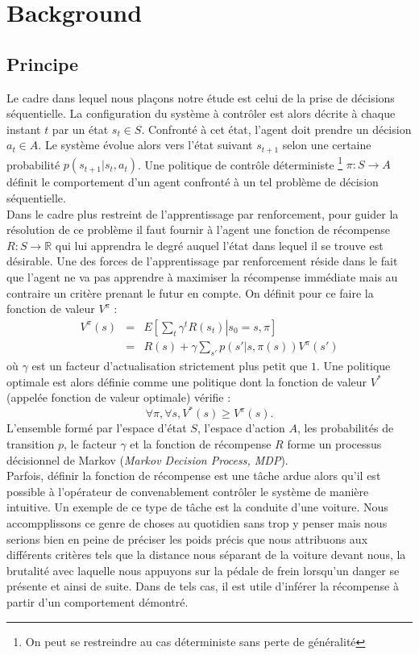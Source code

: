 \documentclass[publibook-draft]{CAp2012}
\begin{document}
\section{Background}
\label{back.sec}
\subsection{Principe}
Le cadre dans lequel nous plaçons notre étude est celui de la prise de décisions séquentielle. La configuration du système à contrôler est alors décrite à chaque instant $t$ par un état $s_t \in S$. Confronté à cet état, l'agent doit prendre un décision $a_t\in A$. Le système évolue alors vers l'état suivant $s_{t+1}$ selon une certaine probabilité $p(s_{t+1}|s_t, a_t)$. Une politique de contrôle déterministe \footnote{On peut se restreindre au cas déterministe sans perte de généralité} $\pi : S\rightarrow A$ définit le comportement d'un agent confronté à un tel problème de décision séquentielle.\\

Dans le cadre plus restreint de l'apprentissage par renforcement, pour guider la résolution de ce problème il faut fournir à l'agent une fonction de récompense $R : S \rightarrow \mathbb{R}$ qui lui apprendra le degré auquel l'état dans lequel il se trouve est désirable. Une des forces de l'apprentissage par renforcement réside dans le fait que l'agent ne va pas apprendre à maximiser la récompense immédiate mais au contraire un critère prenant le futur en compte. On définit pour ce faire la fonction de valeur $V^\pi$ :
\begin{eqnarray}
\label{Vdef.eqn}
V^\pi(s) &=& E\left[\left.\sum_t\gamma^tR(s_t)\right|s_0=s,\pi\right]\\
&=& R(s) + \gamma\sum_{s'}p(s'|s,\pi(s))V^\pi(s')
\end{eqnarray}
où $\gamma$ est un facteur d'actualisation strictement plus petit que $1$. Une politique optimale est alors définie comme une politique dont la fonction de valeur $V^*$ (appelée fonction de valeur optimale) vérifie :
\begin{equation}
\forall \pi, \forall s, V^*(s) \geq V^\pi(s).
\end{equation}
L'ensemble formé par l'espace d'état $S$, l'espace d'action $A$, les probabilités de transition $p$, le facteur $\gamma$ et la fonction de récompense $R$ forme un processus décisionnel de Markov ({\it Markov Decision Process, MDP}).\\

Parfois, définir la fonction de récompense est une tâche ardue alors qu'il est possible à l'opérateur de convenablement contrôler le système de manière intuitive. Un exemple de ce type de tâche est la conduite d'une voiture. Nous accompplissons ce genre de choses au quotidien sans trop y penser mais nous serions bien en peine de préciser les poids précis que nous attribuons aux différents critères tels que la distance nous séparant de la voiture devant nous, la brutalité avec laquelle nous appuyons sur la pédale de frein lorsqu'un danger se présente et ainsi de suite. Dans de tels cas, il est utile d'inférer la récompense à partir d'un comportement démontré.\\
\end{document}
